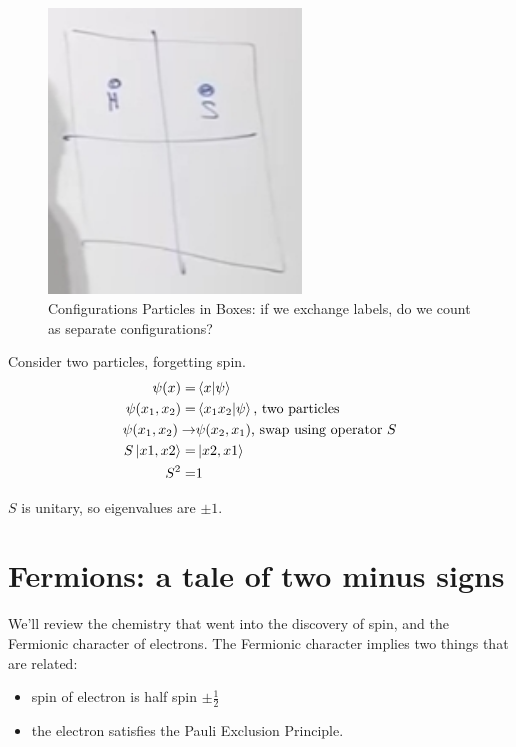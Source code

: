 \documentclass[]{article}
\begin{document}
\begin{figure}[H]
	\begin{center}
		\caption[Configurations Particles in Boxes]{Configurations Particles in Boxes: if we exchange labels, do we count as separate configurations?}\label{fig:aqm-4-particles-boxen}
		\includegraphics[width=0.6\textwidth]{aqm-4-particles-boxen}
	\end{center}
\end{figure}

Consider two particles, forgetting spin.
\begin{align*}
	\psi(x) =& \braket{x|\psi}\\
	\psi(x_1,x_2) =& \braket{x_1x_2|\psi}\text{, two particles}\\
	\psi(x_1,x_2) \rightarrow & \psi(x_2,x_1)\text{, swap using operator $S$}\\
	S\ket{x1,x2} =& \ket{x2,x1}\\
	S^2 =& 1
\end{align*}

$S$ is unitary, so eigenvalues are $\pm1$.

\section{Fermions: a tale of two minus signs}


We'll review the chemistry that went into the discovery of spin, and the Fermionic character of electrons. The Fermionic character implies two things that are related:
\begin{itemize}
	\item spin of electron is half spin $\pm \frac{1}{2}$
	\item the electron satisfies the Pauli Exclusion Principle.
\end{itemize} 
\end{document}
